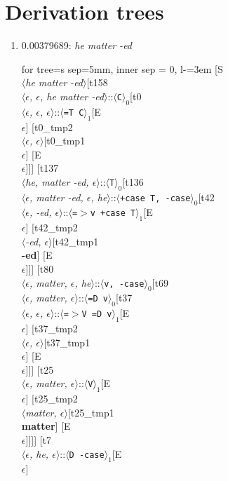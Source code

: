 \documentclass[11pt]{article}
\begin{document}
\section{Derivation trees}
\begin{enumerate}
	\item  0.00379689: \textit{he matter -ed} \\[0.5em]
	\begin{forest}
	for tree={s sep=5mm, inner sep = 0, l-=3em}
	[S\\$\langle$\textit{he matter -ed}$\rangle$[t158\\$\langle$\textit{$\epsilon${,} $\epsilon${,} he matter -ed}$\rangle$::$\langle$\texttt{C}$\rangle_0$[t0\\$\langle$\textit{$\epsilon${,} $\epsilon${,} $\epsilon$}$\rangle$::$\langle$\texttt{{=}T C}$\rangle_1$[E\\$\epsilon$] [t0_tmp2\\$\langle$\textit{$\epsilon${,} $\epsilon$}$\rangle$[t0_tmp1\\$\epsilon$] [E\\$\epsilon$]]] [t137\\$\langle$\textit{he{,} matter -ed{,} $\epsilon$}$\rangle$::$\langle$\texttt{T}$\rangle_0$[t136\\$\langle$\textit{$\epsilon${,} matter -ed{,} $\epsilon${,} he}$\rangle$::$\langle$\texttt{+case T{,} -case}$\rangle_0$[t42\\$\langle$\textit{$\epsilon${,} -ed{,} $\epsilon$}$\rangle$::$\langle$\texttt{{=}$>$v +case T}$\rangle_1$[E\\$\epsilon$] [t42_tmp2\\$\langle$\textit{-ed{,} $\epsilon$}$\rangle$[t42_tmp1\\\textbf{-ed}] [E\\$\epsilon$]]] [t80\\$\langle$\textit{$\epsilon${,} matter{,} $\epsilon${,} he}$\rangle$::$\langle$\texttt{v{,} -case}$\rangle_0$[t69\\$\langle$\textit{$\epsilon${,} matter{,} $\epsilon$}$\rangle$::$\langle$\texttt{{=}D v}$\rangle_0$[t37\\$\langle$\textit{$\epsilon${,} $\epsilon${,} $\epsilon$}$\rangle$::$\langle$\texttt{{=}$>$V {=}D v}$\rangle_1$[E\\$\epsilon$] [t37_tmp2\\$\langle$\textit{$\epsilon${,} $\epsilon$}$\rangle$[t37_tmp1\\$\epsilon$] [E\\$\epsilon$]]] [t25\\$\langle$\textit{$\epsilon${,} matter{,} $\epsilon$}$\rangle$::$\langle$\texttt{V}$\rangle_1$[E\\$\epsilon$] [t25_tmp2\\$\langle$\textit{matter{,} $\epsilon$}$\rangle$[t25_tmp1\\\textbf{matter}] [E\\$\epsilon$]]]] [t7\\$\langle$\textit{$\epsilon${,} he{,} $\epsilon$}$\rangle$::$\langle$\texttt{D -case}$\rangle_1$[E\\$\epsilon$] 
\end{forest}
\end{enumerate}
\end{document}
